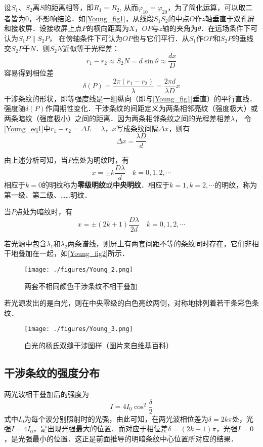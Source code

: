 设$S_1$、$S_2$离$S$的距离相等，即$R_1=R_2$, 从而$\varphi_{10}=\varphi_{20}$，为了简化运算，可以取二者皆为$0$，不影响结论．如\autoref{Young_fig1}，从线段$S_1S_2$的中点$O$作$z$轴垂直于双孔屏和接收屏．设接收屏上点$P$的横向距离为$X$，$OP$与$z$轴的夹角为$\theta$．在远场条件下可认为$S_1P\parallel S_2P$， 在傍轴条件下可认为$OP$也与它们平行．从$S_1$作$OP$和$S_2P$的垂线交$S_2P$于$N$．则$\overline{S_2N}$近似等于光程差：
\begin{equation} \label{Young_eq1}
r_{1}-r_{2} \approx \overline{S_{2} N}=d \sin \theta \approx \frac{d x}{D}
\end{equation}
容易得到相位差
\begin{equation}
\delta(P)=\frac{2 \pi\left(r_{1}-r_{2}\right)}{\lambda}=\frac{2 \pi d}{\lambda D} x
\end{equation}
干涉条纹的形状，即等强度线是一组纵向（即与\autoref{Young_fig1}垂直）的平行直线．强度随$\delta(P)$作周期性变化．干涉条纹的间距定义为两条相邻亮纹（强度极大）或两条暗纹（强度极小）之间的距离．因为两条相邻条纹之间的光程差相差$\lambda$， 令\autoref{Young_eq1}中$r_1-r_2=\Delta L=\lambda$，$ x $写成条纹间隔$\Delta x$，则有
\begin{equation}
\Delta x=\frac{\lambda D}{d}
\end{equation}

由上述分析可知，当$P$点处为明纹时，有
\begin{equation}
x=\pm k \frac{D \lambda}{d} \quad k=0,1,2, \cdots
\end{equation}
相应于$k=0$的明纹称为\textbf{零级明纹}或\textbf{中央明纹}．相应于$k=1, k=2, \cdots$的明纹，称为第一级、第二级、……明纹．

当$P$点处为暗纹时，有
\begin{equation}
x=\pm(2 k+1) \frac{D \lambda}{2 d} \quad k=0,1,2, \cdots
\end{equation}

若光源中包含$\lambda_1$和$\lambda_2$两条谱线，则屏上有两套间距不等的条纹同时存在，它们非相干地叠加在一起，如\autoref{Young_fig2}所示．
\begin{figure}[ht]
\centering
\texttt{[image: ./figures/Young\_2.png]}
\caption{两套不相同颜色干涉条纹不相干叠加} \label{Young_fig2}
\end{figure}
若光源发出的是白光，则在中央零级的白色亮纹两侧，对称地排列着若干条彩色条纹．
\begin{figure}[ht]
\centering
\texttt{[image: ./figures/Young\_3.png]}
\caption{白光的杨氏双缝干涉图样（图片来自维基百科）} \label{Young_fig3}
\end{figure}
\subsection{干涉条纹的强度分布}
两光波相干叠加后的强度为%
\begin{equation}
I=4 I_{0} \cos ^{2} \frac{\delta}{2}
\end{equation}
式中$I_0$为每个波分别照射时的光强，由此可知，在两光波相位差为$\delta=2k\pi$处，光强$I=4I_0$，是出现光强最大的位置．而对应于相位差$\delta=(2k+1)\pi$，光强$I=0$，是光强最小的位置．这正是前面推导的明暗条纹中心位置所对应的结果．
